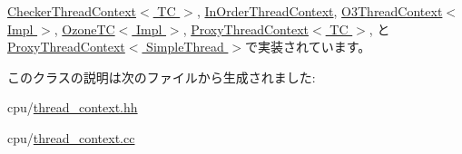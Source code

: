 \hyperlink{classCheckerThreadContext_afc38d04c77e7b5fc3bbb0dd00fc87742}{CheckerThreadContext$<$ TC $>$}, \hyperlink{classInOrderThreadContext_afc38d04c77e7b5fc3bbb0dd00fc87742}{InOrderThreadContext}, \hyperlink{classO3ThreadContext_a4ea132a82460e5b862e551541cecde9e}{O3ThreadContext$<$ Impl $>$}, \hyperlink{classOzoneCPU_1_1OzoneTC_afc38d04c77e7b5fc3bbb0dd00fc87742}{OzoneTC$<$ Impl $>$}, \hyperlink{classProxyThreadContext_afc38d04c77e7b5fc3bbb0dd00fc87742}{ProxyThreadContext$<$ TC $>$}, と \hyperlink{classProxyThreadContext_afc38d04c77e7b5fc3bbb0dd00fc87742}{ProxyThreadContext$<$ SimpleThread $>$}で実装されています。

このクラスの説明は次のファイルから生成されました:\begin{DoxyCompactItemize}
\item 
cpu/\hyperlink{thread__context_8hh}{thread\_\-context.hh}\item 
cpu/\hyperlink{thread__context_8cc}{thread\_\-context.cc}\end{DoxyCompactItemize}
